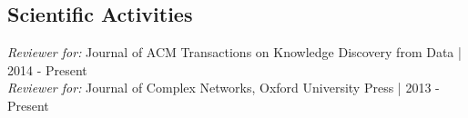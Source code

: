 \documentclass[letter]{res}
\begin{document}
\begin{resume}
		
		\section{Scientific Activities}
		{\sl Reviewer for:  }Journal of ACM Transactions on Knowledge Discovery from Data | 2014 - Present\\
		{\sl Reviewer for:  }Journal of Complex Networks, Oxford University Press | 2013 - Present\\
		
		
		
		
		\centerline{}
		
	\end{resume}
\end{document}
